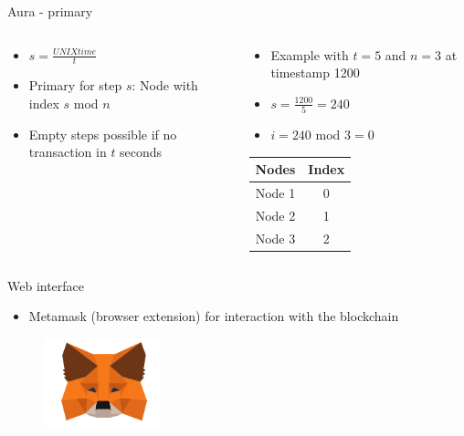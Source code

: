 \documentclass[10pt]{beamer}
\begin{document}
\begin{frame}{Aura - primary}
	\begin{columns}
		\begin{column}{0.48\textwidth}
			\begin{itemize}
				\item $s = \frac{UNIXtime}{t}$
				\item Primary for step $s$: Node with index $s$ mod $n$
				\item Empty steps possible if no transaction in $t$ seconds
			\end{itemize}
		\end{column}
		\begin{column}{0.48\textwidth}
			\begin{itemize}
				\item Example with $t = 5$ and $n = 3$ at timestamp 1200
				\item $s = \frac{1200}{5} = 240$
				\item $i = 240$ mod $3 = 0$
			\end{itemize}
			\vspace{5mm}
			\begin{tabular}{ | c | c | }
				\hline
				Nodes & Index \\\hline
				\cellcolor{green} Node 1 & \cellcolor{green} 0 \\\hline
				Node 2 & 1 \\\hline
				Node 3 & 2 \\
				\hline
			\end{tabular}
		\end{column}
	\end{columns}
\end{frame}

\begin{frame}{Web interface}
	\begin{itemize}
		\item Metamask (browser extension) for interaction with the blockchain
	\end{itemize}
	\begin{figure}
		\includegraphics[width=0.3\textwidth]{images/mm-logo.png}
	\end{figure}
\end{frame}
\end{document}
